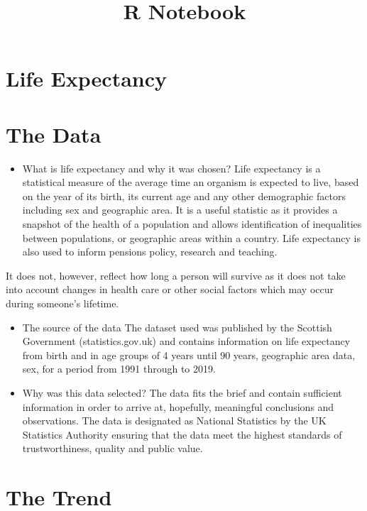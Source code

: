 \documentclass[
]{article}
\title{R Notebook}
\author{}
\date{\vspace{-2.5em}}
\providecommand{\tightlist}{%
  \setlength{\itemsep}{0pt}\setlength{\parskip}{0pt}}
\begin{document}
\maketitle

\hypertarget{life-expectancy}{%
\section{Life Expectancy}\label{life-expectancy}}

\hypertarget{the-data}{%
\section{The Data}\label{the-data}}

\begin{itemize}
\tightlist
\item
  What is life expectancy and why it was chosen? Life expectancy is a
  statistical measure of the average time an organism is expected to
  live, based on the year of its birth, its current age and any other
  demographic factors including sex and geographic area. It is a useful
  statistic as it provides a snapshot of the health of a population and
  allows identification of inequalities between populations, or
  geographic areas within a country. Life expectancy is also used to
  inform pensions policy, research and teaching.
\end{itemize}

It does not, however, reflect how long a person will survive as it does
not take into account changes in health care or other social factors
which may occur during someone's lifetime.

\begin{itemize}
\item
  The source of the data The dataset used was published by the Scottish
  Government (statistics.gov.uk) and contains information on life
  expectancy from birth and in age groups of 4 years until 90 years,
  geographic area data, sex, for a period from 1991 through to 2019.
\item
  Why was this data selected? The data fits the brief and contain
  sufficient information in order to arrive at, hopefully, meaningful
  conclusions and observations. The data is designated as National
  Statistics by the UK Statistics Authority ensuring that the data meet
  the highest standards of trustworthiness, quality and public value.
\end{itemize}

\hypertarget{the-trend}{%
\section{The Trend}\label{the-trend}}
\end{document}
